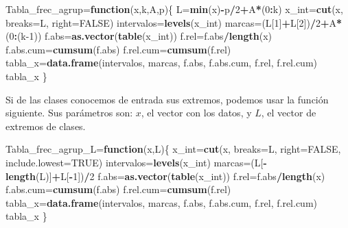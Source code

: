 \documentclass[]{book}
\newenvironment{Shaded}{\begin{snugshade}}{\end{snugshade}}
\newcommand{\ControlFlowTok}[1]{\textcolor[rgb]{0.13,0.29,0.53}{\textbf{#1}}}
\newcommand{\DataTypeTok}[1]{\textcolor[rgb]{0.13,0.29,0.53}{#1}}
\newcommand{\DecValTok}[1]{\textcolor[rgb]{0.00,0.00,0.81}{#1}}
\newcommand{\KeywordTok}[1]{\textcolor[rgb]{0.13,0.29,0.53}{\textbf{#1}}}
\newcommand{\NormalTok}[1]{#1}
\newcommand{\OperatorTok}[1]{\textcolor[rgb]{0.81,0.36,0.00}{\textbf{#1}}}
\newcommand{\OtherTok}[1]{\textcolor[rgb]{0.56,0.35,0.01}{#1}}
\theoremstyle{definition}
\theoremstyle{definition}
\theoremstyle{definition}
\theoremstyle{remark}
\begin{document}
\begin{Shaded}
\begin{Highlighting}[]
\NormalTok{Tabla_frec_agrup=}\ControlFlowTok{function}\NormalTok{(x,k,A,p)\{}
\NormalTok{    L=}\KeywordTok{min}\NormalTok{(x)}\OperatorTok{-}\NormalTok{p}\OperatorTok{/}\DecValTok{2}\OperatorTok{+}\NormalTok{A}\OperatorTok{*}\NormalTok{(}\DecValTok{0}\OperatorTok{:}\NormalTok{k)}
\NormalTok{    x_int=}\KeywordTok{cut}\NormalTok{(x, }\DataTypeTok{breaks=}\NormalTok{L, }\DataTypeTok{right=}\OtherTok{FALSE}\NormalTok{)}
\NormalTok{    intervalos=}\KeywordTok{levels}\NormalTok{(x_int)}
\NormalTok{    marcas=(L[}\DecValTok{1}\NormalTok{]}\OperatorTok{+}\NormalTok{L[}\DecValTok{2}\NormalTok{])}\OperatorTok{/}\DecValTok{2}\OperatorTok{+}\NormalTok{A}\OperatorTok{*}\NormalTok{(}\DecValTok{0}\OperatorTok{:}\NormalTok{(k}\DecValTok{-1}\NormalTok{))}
\NormalTok{    f.abs=}\KeywordTok{as.vector}\NormalTok{(}\KeywordTok{table}\NormalTok{(x_int))}
\NormalTok{    f.rel=f.abs}\OperatorTok{/}\KeywordTok{length}\NormalTok{(x)}
\NormalTok{    f.abs.cum=}\KeywordTok{cumsum}\NormalTok{(f.abs)}
\NormalTok{    f.rel.cum=}\KeywordTok{cumsum}\NormalTok{(f.rel)}
\NormalTok{    tabla_x=}\KeywordTok{data.frame}\NormalTok{(intervalos, marcas, f.abs, f.abs.cum, f.rel, f.rel.cum)}
\NormalTok{    tabla_x}
\NormalTok{  \}}
\end{Highlighting}
\end{Shaded}

Si de las clases conocemos de entrada sus extremos, podemos usar la función siguiente.
Sus parámetros son: \(x\), el vector con los datos, y \(L\), el vector de extremos de clases.

\begin{Shaded}
\begin{Highlighting}[]
\NormalTok{Tabla_frec_agrup_L=}\ControlFlowTok{function}\NormalTok{(x,L)\{}
\NormalTok{    x_int=}\KeywordTok{cut}\NormalTok{(x, }\DataTypeTok{breaks=}\NormalTok{L, }\DataTypeTok{right=}\OtherTok{FALSE}\NormalTok{, }\DataTypeTok{include.lowest=}\OtherTok{TRUE}\NormalTok{)}
\NormalTok{    intervalos=}\KeywordTok{levels}\NormalTok{(x_int)}
\NormalTok{    marcas=(L[}\OperatorTok{-}\KeywordTok{length}\NormalTok{(L)]}\OperatorTok{+}\NormalTok{L[}\OperatorTok{-}\DecValTok{1}\NormalTok{])}\OperatorTok{/}\DecValTok{2}
\NormalTok{    f.abs=}\KeywordTok{as.vector}\NormalTok{(}\KeywordTok{table}\NormalTok{(x_int))}
\NormalTok{    f.rel=f.abs}\OperatorTok{/}\KeywordTok{length}\NormalTok{(x)}
\NormalTok{    f.abs.cum=}\KeywordTok{cumsum}\NormalTok{(f.abs)}
\NormalTok{    f.rel.cum=}\KeywordTok{cumsum}\NormalTok{(f.rel)}
\NormalTok{    tabla_x=}\KeywordTok{data.frame}\NormalTok{(intervalos, marcas, f.abs, f.abs.cum, f.rel, f.rel.cum)}
\NormalTok{    tabla_x}
\NormalTok{  \}}
\end{Highlighting}
\end{Shaded}
\end{document}
